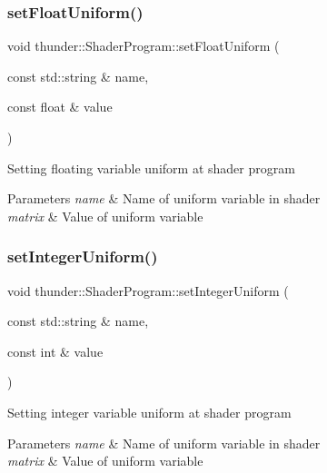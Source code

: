 \subsubsection{\texorpdfstring{set\+Float\+Uniform()}{setFloatUniform()}}
{\footnotesize\ttfamily void thunder\+::\+Shader\+Program\+::set\+Float\+Uniform (\begin{DoxyParamCaption}\item[{const std\+::string \&}]{name,  }\item[{const float \&}]{value }\end{DoxyParamCaption})}

Setting floating variable uniform at shader program


\begin{DoxyParams}{Parameters}
{\em name} & Name of uniform variable in shader \\
\hline
{\em matrix} & Value of uniform variable \\
\hline
\end{DoxyParams}
\mbox{\label{classthunder_1_1_shader_program_aa763d389b3670b9c17276ce144729d16}} 
\subsubsection{\texorpdfstring{set\+Integer\+Uniform()}{setIntegerUniform()}}
{\footnotesize\ttfamily void thunder\+::\+Shader\+Program\+::set\+Integer\+Uniform (\begin{DoxyParamCaption}\item[{const std\+::string \&}]{name,  }\item[{const int \&}]{value }\end{DoxyParamCaption})}

Setting integer variable uniform at shader program


\begin{DoxyParams}{Parameters}
{\em name} & Name of uniform variable in shader \\
\hline
{\em matrix} & Value of uniform variable \\
\hline
\end{DoxyParams}
\mbox{\label{classthunder_1_1_shader_program_a4a16ff2da021f298a4f00957e987682c}} 
